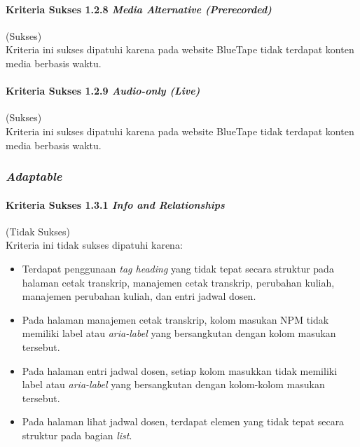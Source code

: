 \paragraph{Kriteria Sukses 1.2.8 \textit{Media Alternative (Prerecorded)}}
\label{par:kepatuhan_bluetape_kriteria_sukses_1.2.8}
(Sukses)\\

Kriteria ini sukses dipatuhi karena pada website BlueTape tidak terdapat konten media berbasis waktu.

\paragraph{Kriteria Sukses 1.2.9 \textit{Audio-only (Live)}}
\label{par:kepatuhan_bluetape_kriteria_sukses_1.2.9}
(Sukses)\\

Kriteria ini sukses dipatuhi karena pada website BlueTape tidak terdapat konten media berbasis waktu.

\subsubsection{\textit{Adaptable}}
\label{subsubsec:kepatuhan_bluetape_adaptable}

\paragraph{Kriteria Sukses 1.3.1 \textit{Info and Relationships}}
\label{par:kepatuhan_bluetape_kriteria_sukses_1.3.1}
(Tidak Sukses)\\

Kriteria ini tidak sukses dipatuhi karena:
\begin{itemize}
    \item Terdapat penggunaan \textit{tag heading} yang tidak tepat secara struktur pada halaman cetak transkrip, manajemen cetak transkrip, perubahan kuliah, manajemen perubahan kuliah, dan entri jadwal dosen.
    \item Pada halaman manajemen cetak transkrip, kolom masukan NPM tidak memiliki label atau \textit{aria-label} yang bersangkutan dengan kolom masukan tersebut.
    \item Pada halaman entri jadwal dosen, setiap kolom masukkan tidak memiliki label atau \textit{aria-label} yang bersangkutan dengan kolom-kolom masukan tersebut.
    \item Pada halaman lihat jadwal dosen, terdapat elemen yang tidak tepat secara struktur pada bagian \textit{list}.
\end{itemize} 

